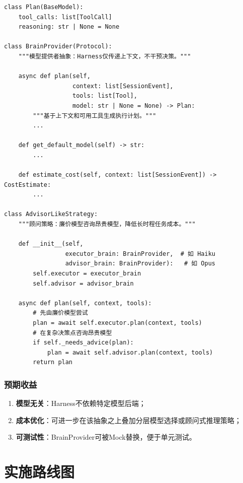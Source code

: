 \documentclass[12pt,a4paper]{ctexart}
\begin{document}
\begin{lstlisting}[caption={BrainProvider抽象}]
class Plan(BaseModel):
    tool_calls: list[ToolCall]
    reasoning: str | None = None

class BrainProvider(Protocol):
    """模型提供者抽象：Harness仅传递上下文，不干预决策。"""

    async def plan(self,
                   context: list[SessionEvent],
                   tools: list[Tool],
                   model: str | None = None) -> Plan:
        """基于上下文和可用工具生成执行计划。"""
        ...

    def get_default_model(self) -> str:
        ...

    def estimate_cost(self, context: list[SessionEvent]) -> CostEstimate:
        ...

class AdvisorLikeStrategy:
    """顾问策略：廉价模型咨询昂贵模型，降低长时程任务成本。"""

    def __init__(self,
                 executor_brain: BrainProvider,  # 如 Haiku
                 advisor_brain: BrainProvider):   # 如 Opus
        self.executor = executor_brain
        self.advisor = advisor_brain

    async def plan(self, context, tools):
        # 先由廉价模型尝试
        plan = await self.executor.plan(context, tools)
        # 在复杂决策点咨询昂贵模型
        if self._needs_advice(plan):
            plan = await self.advisor.plan(context, tools)
        return plan
\end{lstlisting}

\subsubsection{预期收益}

\begin{enumerate}
    \item \textbf{模型无关}：Harness不依赖特定模型后端；
    \item \textbf{成本优化}：可进一步在该抽象之上叠加分层模型选择或顾问式推理策略；
    \item \textbf{可测试性}：BrainProvider可被Mock替换，便于单元测试。
\end{enumerate}

\section{实施路线图}\label{sec:roadmap}
\end{document}
